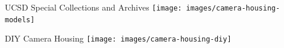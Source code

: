 




\begin{frame}{UCSD Special Collections and Archives}
  \centering
  \texttt{[image: images/camera-housing-models]}
\end{frame}

\begin{frame}{DIY Camera Housing}
  \centering
  \texttt{[image: images/camera-housing-diy]}
\end{frame}


